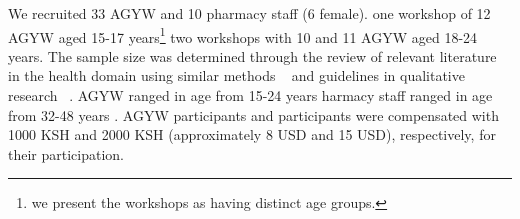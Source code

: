 We recruited 33 AGYW and 10 pharmacy staff (6 female).  one workshop of 12 AGYW aged 15-17 years\footnote{ we present the  workshops as having  distinct age groups.}\ladd{,}  two workshops with 10 and 11 AGYW aged 18-24 years. The sample size was determined through the review of relevant literature in the health domain using similar methods ~\cite{hunter2021designing, wilkinson2022developing, harrington2021spoiled} and guidelines in qualitative research ~\cite{sandelowski1995sample}. AGYW ranged in age from 15-24 years  harmacy staff ranged in age from 32-48 years .  AGYW participants and  participants were compensated with 1000 KSH and 2000 KSH (approximately 8 USD and 15 USD), respectively, for their participation. 

